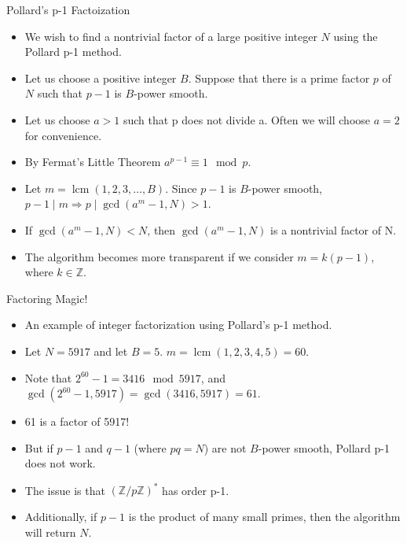 \documentclass{beamer}
\DeclareMathOperator{\lcm}{lcm}
\begin{document}
	\begin{frame}{Pollard's p-1 Factoization}
		\begin{itemize}
			\item We wish to find a nontrivial factor of a large positive integer $N$ using the Pollard p-1 method.
			\item Let us choose a positive integer $B$. Suppose that there is a prime factor $p$ of $N$ such that $p-1$ is $B$-power smooth.
			\item Let us choose $a > 1$ such that p does not divide a. Often we will choose $a=2$ for convenience.
			\item By Fermat's Little Theorem $a^{p-1} \equiv 1 \mod p$.
			\item Let $m = \lcm (1,2,3,\dotso,B)$. Since $p-1$ is $B$-power smooth, $p-1 \mid m \Longrightarrow p \mid \gcd (a^m-1,N) > 1$.
			\item If $\gcd (a^m-1,N) < N$, then $\gcd (a^m-1,N)$ is a nontrivial factor of N.
			\item The algorithm becomes more transparent if we consider $m=k(p-1)$, where $k\in\mathbb{Z}$.
		\end{itemize}
	\end{frame}
	
	\begin{frame}{Factoring Magic!}
		\begin{itemize}
			\item An example of integer factorization using Pollard's p-1 method.
			\item Let $N=5917$ and let $B=5$. $m=\lcm (1,2,3,4,5)=60$.
			\item Note that $2^{60}-1=3416 \mod 5917$, and $\gcd (2^{60}-1, 5917)=\gcd (3416, 5917)=61$.
			\item 61 is a factor of 5917!
			\item But if $p-1$ and $q-1$ (where $pq=N$) are not $B$-power smooth, Pollard p-1 does not work.
			\item The issue is that $(\mathbb{Z}/p\mathbb{Z})^*$ has order p-1.
			\item Additionally, if $p-1$ is the product of many small primes, then the algorithm will return $N$.
		\end{itemize}
	\end{frame}
	
\end{document}
